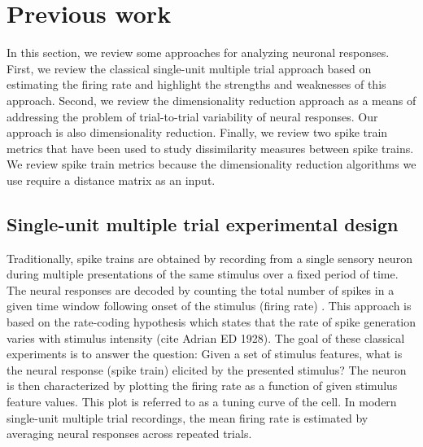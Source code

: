 
\section{Previous work}
In this section, we review some approaches for analyzing neuronal responses.
First, we review the classical single-unit multiple trial approach based 
on estimating the firing rate and highlight the strengths
and weaknesses of this approach. Second, we review the dimensionality
reduction approach as a means of addressing the problem of trial-to-trial variability of neural responses. Our approach is also dimensionality reduction. Finally, we review two spike train metrics that have been used to study dissimilarity measures between spike trains. 
We review spike train metrics because the dimensionality reduction algorithms we use require a distance matrix as an input.


\subsection{Single-unit multiple trial experimental design}
Traditionally, spike trains are obtained by recording from a single sensory neuron during multiple presentations of the same stimulus over a fixed period of time. The neural responses are decoded by counting the total number of spikes in a given time window following onset of the stimulus (firing rate) \cite{Abbott2001}.
This approach is based on the rate-coding hypothesis which states that the rate of spike generation varies with stimulus intensity (cite Adrian ED 1928).
The goal of these classical experiments is to answer the question:
Given a set of stimulus features, what is the neural response (spike train) elicited by the presented stimulus? The neuron is then characterized by plotting the firing rate as a function of given stimulus feature values. This plot is referred to as a tuning curve of the cell.
In modern single-unit multiple trial recordings, the mean firing rate is estimated by averaging neural responses across repeated trials.


